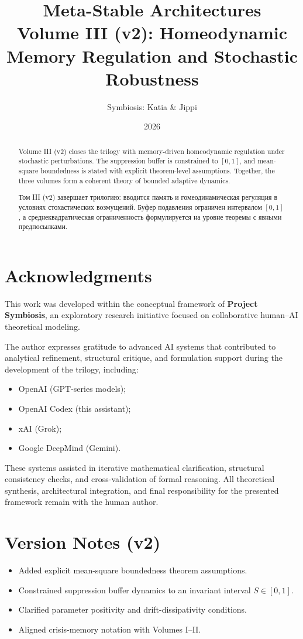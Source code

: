 ﻿\documentclass[12pt,a4paper]{article}
\title{
    \textbf{Meta-Stable Architectures}\\
    \Large Volume III (v2): Homeodynamic Memory Regulation and Stochastic Robustness
}
\author{Symbiosis: Katia \& Jippi}
\date{2026}
\begin{document}
\maketitle

\begin{abstract}
Volume III (v2) closes the trilogy with memory-driven homeodynamic regulation under stochastic perturbations. The suppression buffer is constrained to $[0,1]$, and mean-square boundedness is stated with explicit theorem-level assumptions. Together, the three volumes form a coherent theory of bounded adaptive dynamics.
\end{abstract}

\begin{abstract}
Том III (v2) завершает трилогию: вводится память и гомеодинамическая регуляция в условиях стохастических возмущений. Буфер подавления ограничен интервалом $[0,1]$, а среднеквадратическая ограниченность формулируется на уровне теоремы с явными предпосылками.
\end{abstract}

\section*{Acknowledgments}
This work was developed within the conceptual framework of \textbf{Project Symbiosis}, an exploratory research initiative focused on collaborative human--AI theoretical modeling.

The author expresses gratitude to advanced AI systems that contributed to analytical refinement, structural critique, and formulation support during the development of the trilogy, including:
\begin{itemize}
    \item OpenAI (GPT-series models);
    \item OpenAI Codex (this assistant);
    \item xAI (Grok);
    \item Google DeepMind (Gemini).
\end{itemize}
These systems assisted in iterative mathematical clarification, structural consistency checks, and cross-validation of formal reasoning. All theoretical synthesis, architectural integration, and final responsibility for the presented framework remain with the human author.

\section*{Version Notes (v2)}
\begin{itemize}
    \item Added explicit mean-square boundedness theorem assumptions.
    \item Constrained suppression buffer dynamics to an invariant interval $S\in[0,1]$.
    \item Clarified parameter positivity and drift-dissipativity conditions.
    \item Aligned crisis-memory notation with Volumes I--II.
\end{itemize}
\end{document}
